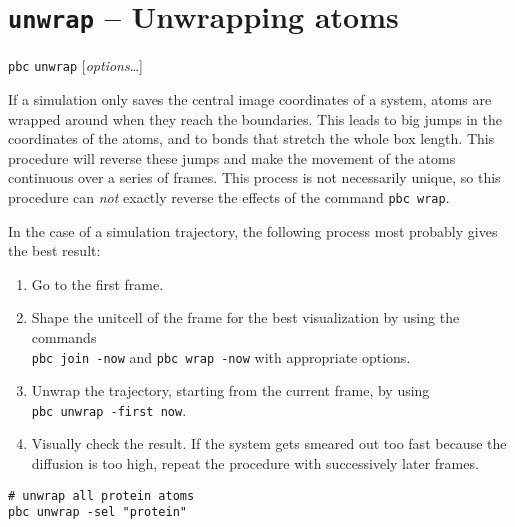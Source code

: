 \documentclass[a4paper, DIV12]{scrartcl}
\begin{document}
\newpage
\section{\texttt{unwrap} -- Unwrapping atoms}
\label{sec:unwrap}

\texttt{pbc} \texttt{unwrap} [\textit{options}\dots]


If a simulation only saves the central image coordinates of a system,
atoms are wrapped around when they reach the boundaries.  This leads
to big jumps in the coordinates of the atoms, and to bonds that
stretch the whole box length. This procedure will reverse these jumps
and make the movement of the atoms continuous over a series of
frames. This process is not necessarily unique, so this procedure can
\emph{not} exactly reverse the effects of the command \texttt{pbc
  wrap}.

In the case of a simulation trajectory, the following process most
probably gives the best result:
\begin{enumerate}
\item Go to the first frame.
\item \label{shape} Shape the unitcell of the frame for the best
  visualization by using the commands\\ \mbox{\texttt{pbc join -now}}
  and \mbox{\texttt{pbc wrap -now}} with appropriate options.
\item Unwrap the trajectory, starting from the current frame, by using\\
  \mbox{\texttt{pbc unwrap -first now}}.
\item Visually check the result. If the system gets smeared out too
  fast because the diffusion is too high, repeat the procedure with
  successively later frames.
\end{enumerate}


\begin{Verbatim}
# unwrap all protein atoms
pbc unwrap -sel "protein"
\end{Verbatim}

\end{document}
